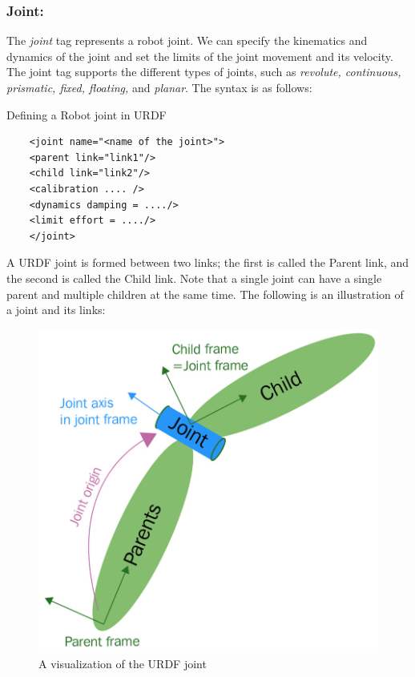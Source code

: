 \documentclass[../../main]{subfiles}
\begin{document}
\subsubsection{Joint:}
The \emph{joint} tag represents a robot joint. We can specify the kinematics and
dynamics of the joint and set the limits of the joint movement and its velocity. The
joint tag supports the different types of joints, such as \emph{revolute, continuous,
prismatic, fixed, floating,} and \emph{planar}.
The syntax is as follows:
\begin{codebox}[]{Defining a Robot joint in URDF}
  \begin{verbatim}
    <joint name="<name of the joint>">
    <parent link="link1"/>
    <child link="link2"/>
    <calibration .... />
    <dynamics damping = ..../>
    <limit effort = ..../>
    </joint>
\end{verbatim}
\end{codebox}
A URDF joint is formed between two links; the first is called the Parent link, and the
second is called the Child link. Note that a single joint can have a single parent and
multiple children at the same time. The following is an illustration of a joint and its links:
\begin{figure}[ht]
    \centering
    \includegraphics{sublatex/hashem/img/joint1.jpg}
    \caption{A visualization of the URDF joint\cite{joseph2018mastering}}
\end{figure}
\end{document}
